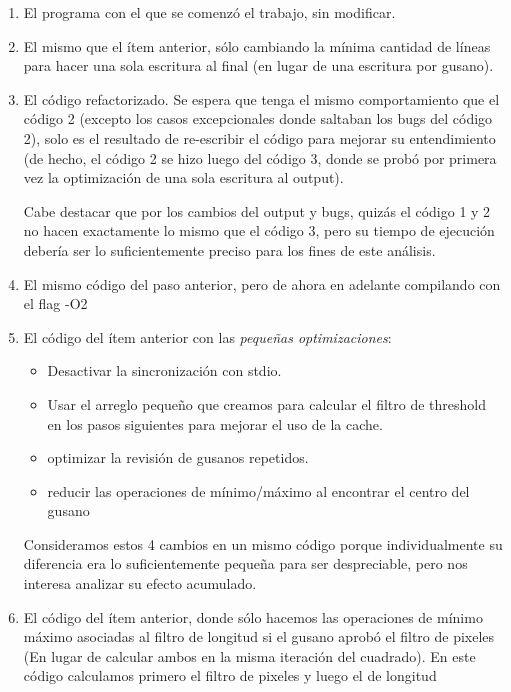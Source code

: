 \documentclass{article}
\begin{document}
\begin{enumerate}
\item \label{first_code} El programa con el que se comenzó el trabajo, sin modificar.

\item El mismo que el ítem anterior, sólo cambiando la mínima cantidad de líneas para hacer una sola escritura al final (en lugar de una escritura por gusano).

\item El código refactorizado. Se espera que tenga el mismo comportamiento que el código 2 (excepto los casos excepcionales donde saltaban los bugs del código 2), solo es el resultado de re-escribir el código para mejorar su entendimiento (de hecho, el código 2 se hizo luego del código 3, donde se probó por primera vez la optimización de una sola escritura al output).

Cabe destacar que por los cambios del output y bugs, quizás el código 1 y 2 no hacen exactamente lo mismo que el código 3, pero su tiempo de ejecución debería ser lo suficientemente preciso para los fines de este análisis.
\item El mismo código del paso anterior, pero de ahora en adelante compilando con el flag -O2

\item \label{best_code} El código del ítem anterior con las \emph{pequeñas optimizaciones}:
\begin{itemize}
\item Desactivar la sincronización con stdio.
\item Usar el arreglo pequeño que creamos para calcular el filtro de threshold en los pasos siguientes para mejorar el uso de la cache.
\item optimizar la revisión de gusanos repetidos.
\item reducir las operaciones de mínimo/máximo al encontrar el centro del gusano
\end{itemize}

Consideramos estos 4 cambios en un mismo código porque individualmente su diferencia era lo suficientemente pequeña para ser despreciable, pero nos interesa analizar su efecto acumulado.

\item El código del ítem anterior, donde sólo hacemos las operaciones de mínimo máximo asociadas al filtro de longitud si el gusano aprobó el filtro de pixeles (En lugar de calcular ambos en la misma iteración del cuadrado). En este código calculamos primero el filtro de pixeles y luego el de longitud


\end{enumerate}
\end{document}
